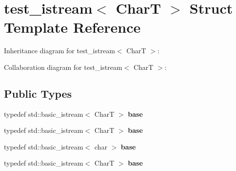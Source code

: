 \hypertarget{structtest__istream}{}\section{test\+\_\+istream$<$ CharT $>$ Struct Template Reference}
\label{structtest__istream}


Inheritance diagram for test\+\_\+istream$<$ CharT $>$\+:


Collaboration diagram for test\+\_\+istream$<$ CharT $>$\+:
\subsection*{Public Types}
\begin{DoxyCompactItemize}
\item 
\mbox{\label{structtest__istream_a80ba07aecbbcaa0bdcfab357f8056302}} 
typedef std\+::basic\+\_\+istream$<$ CharT $>$ {\bfseries base}
\item 
\mbox{\label{structtest__istream_a80ba07aecbbcaa0bdcfab357f8056302}} 
typedef std\+::basic\+\_\+istream$<$ CharT $>$ {\bfseries base}
\item 
\mbox{\label{structtest__istream_afd01b8ce7caa1d2d6e894a358b6f5c8f}} 
typedef std\+::basic\+\_\+istream$<$ char $>$ {\bfseries base}
\item 
\mbox{\label{structtest__istream_a80ba07aecbbcaa0bdcfab357f8056302}} 
typedef std\+::basic\+\_\+istream$<$ CharT $>$ {\bfseries base}
\end{DoxyCompactItemize}

